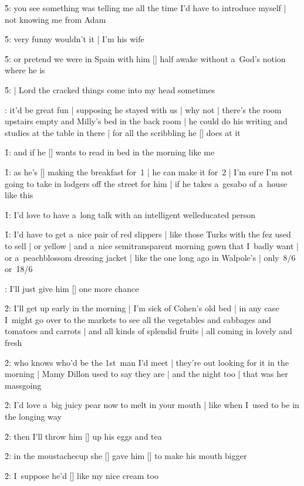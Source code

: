 \f5:
you see something was telling me all the time I'd have to introduce myself |
not knowing me from Adam

\f5:
very funny wouldn't it |
I'm his wife

\f5:
or pretend we were in Spain with him [\stephen] half awake
without a~God's notion where he is

\f5:
 |
Lord the cracked things come into my head sometimes

:
it'd be great fun |
supposing he stayed with us |
why not |
there's the room upstairs empty and Milly's bed in the back room |
he could do his writing and studies at the table in there |
for all the scribbling he [\bloom] does at it

\f1:
and if he [\stephen] wants to read in bed in the morning like me

\f1:
as he's [\bloom] making the breakfast for~1 |
he can make it for~2 |
I'm sure I'm not going to take in lodgers off the street for him |
if he takes a~gesabo of a~house like this

\f1:
I'd love to have a~long talk with an intelligent welleducated person

\f1:
I'd have to get a~nice pair of red slippers |
like those Turks with the fez used to sell |
or yellow |
and a~nice semitransparent morning gown that I~badly want |
or a~peachblossom dressing jacket |
like the one long ago in Walpole's |
only~8/6 or~18/6

:
I'll just give him [\bloom] one more chance

\f2:
I'll get up early in the morning |
I'm sick of Cohen's old bed |
in any case I~might go over to the markets
to see all the vegetables and cabbages and tomatoes and carrots |
and all kinds of splendid fruits |
all coming in lovely and fresh

\f2:
who knows who'd be the 1st~man I'd meet |
they're out looking for it in the morning |
Mamy Dillon used to say they are |
and the night too |
that was her massgoing

\f2:
I'd love a~big juicy pear now to melt in your mouth |
like when I~used to be in the longing way

\f2:
then I'll throw him [\stephen] up his eggs and tea

\f2:
in the moustachecup she [\milly] gave him [\bloom] to make his mouth bigger

\f2:
I~suppose he'd [\stephen] like my nice cream too

